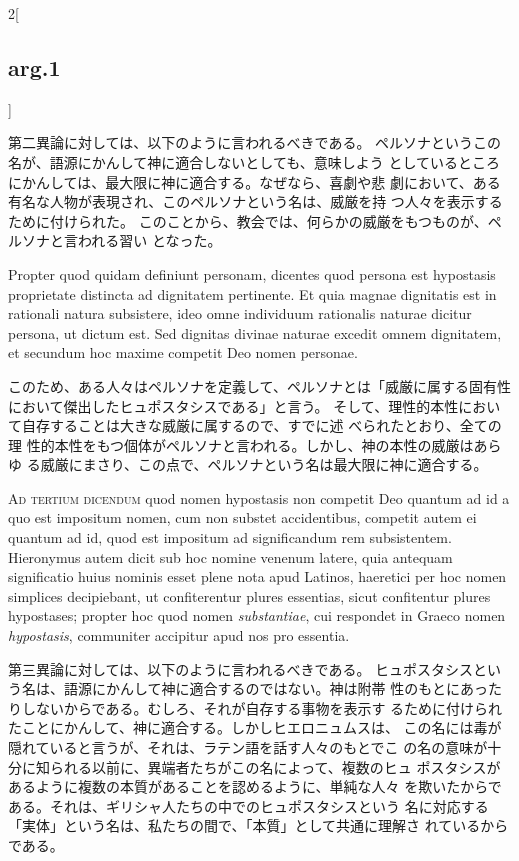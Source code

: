 \documentclass[paper=a4paper,fontsize=10pt,jafontsize=9pt,titlepage]{jlreq}
\begin{document}
\begin{paracol}{2}[\subsection{arg.1}]
\switchcolumn

第二異論に対しては、以下のように言われるべきである。
ペルソナというこの名が、語源にかんして神に適合しないとしても、意味しよう
 としているところにかんしては、最大限に神に適合する。なぜなら、喜劇や悲
 劇において、ある有名な人物が表現され、このペルソナという名は、威厳を持
 つ人々を表示するために付けられた。
このことから、教会では、何らかの威厳をもつものが、ペルソナと言われる習い
 となった。

\switchcolumn*

Propter quod quidam definiunt personam, dicentes quod
persona est hypostasis proprietate distincta ad dignitatem
pertinente. 
Et quia magnae dignitatis est in rationali natura
subsistere, ideo omne individuum rationalis naturae dicitur persona, ut
dictum est. Sed dignitas divinae naturae excedit omnem dignitatem, et
secundum hoc maxime competit Deo nomen personae.

\switchcolumn

このため、ある人々はペルソナを定義して、ペルソナとは「威厳に属する固有性
 において傑出したヒュポスタシスである」と言う。
そして、理性的本性において自存することは大きな威厳に属するので、すでに述
 べられたとおり、全ての理
 性的本性をもつ個体がペルソナと言われる。しかし、神の本性の威厳はあらゆ
 る威厳にまさり、この点で、ペルソナという名は最大限に神に適合する。

\switchcolumn*[\subsection{ad.3}]

{\scshape Ad tertium dicendum} quod nomen hypostasis non competit Deo quantum ad id
a quo est impositum nomen, cum non substet accidentibus, competit autem
ei quantum ad id, quod est impositum ad significandum rem
subsistentem. Hieronymus autem dicit sub hoc nomine venenum latere, quia
antequam significatio huius nominis esset plene nota apud Latinos,
haeretici per hoc nomen simplices decipiebant, ut confiterentur plures
essentias, sicut confitentur plures hypostases; propter hoc quod nomen
{\itshape substantiae}, cui respondet in Graeco nomen {\itshape hypostasis}, communiter
accipitur apud nos pro essentia.

\switchcolumn

第三異論に対しては、以下のように言われるべきである。
ヒュポスタシスという名は、語源にかんして神に適合するのではない。神は附帯
 性のもとにあったりしないからである。むしろ、それが自存する事物を表示す
 るために付けられたことにかんして、神に適合する。しかしヒエロニュムスは、
 この名には毒が隠れていると言うが、それは、ラテン語を話す人々のもとでこ
 の名の意味が十分に知られる以前に、異端者たちがこの名によって、複数のヒュ
 ポスタシスがあるように複数の本質があることを認めるように、単純な人々
 を欺いたからである。それは、ギリシャ人たちの中でのヒュポスタシスという
 名に対応する「実体」という名は、私たちの間で、「本質」として共通に理解さ
 れているからである。


\end{paracol}
\end{document}
